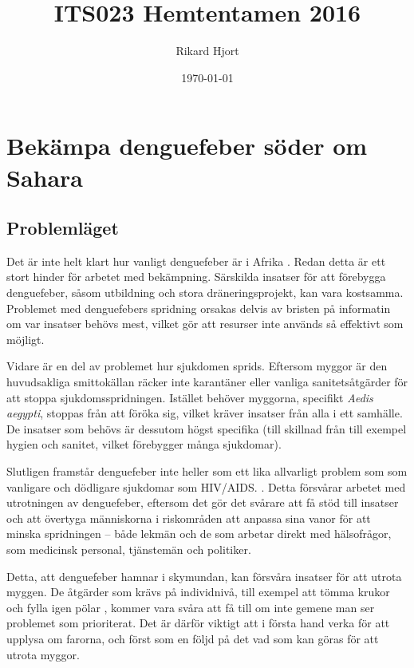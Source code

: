 \documentclass{article}
\title{ITS023 Hemtentamen 2016}
\date{\today}
\author{Rikard Hjort}
\begin{document}
\maketitle

\section{Bekämpa denguefeber söder om Sahara}

\subsection{Problemläget}


Det är inte helt klart hur vanligt denguefeber är i Afrika \cite[s. 8]{WHO:2009}. Redan detta är ett stort hinder för arbetet med bekämpning. Särskilda insatser för att förebygga denguefeber, såsom utbildning och stora dräneringsprojekt, kan vara kostsamma. Problemet med denguefebers spridning orsakas delvis av bristen på informatin om var insatser behövs mest, vilket gör att resurser inte används så effektivt som möjligt.

Vidare är en del av problemet hur sjukdomen sprids. Eftersom myggor är den huvudsakliga smittokällan \cite[s. 14]{WHO:2009} räcker inte karantäner eller vanliga sanitetsåtgärder för att stoppa sjukdomsspridningen. Istället behöver myggorna, specifikt \emph{Aedis aegypti}, stoppas från att föröka sig, vilket kräver insatser från alla i ett samhälle. De insatser som behövs är dessutom högst specifika (till skillnad från till exempel hygien och sanitet, vilket förebygger många sjukdomar).

Slutligen framstår denguefeber inte heller som ett lika allvarligt problem som som vanligare och dödligare sjukdomar som HIV/AIDS. \cite[s. 8]{WHO:2009}. Detta försvårar arbetet med utrotningen av denguefeber, eftersom det gör det svårare att få stöd till insatser och att övertyga människorna i riskområden att anpassa sina vanor för att minska spridningen – både lekmän och de som arbetar direkt med hälsofrågor, som medicinsk personal, tjänstemän och politiker.

Detta, att denguefeber hamnar i skymundan, kan försvåra insatser för att utrota myggen. De åtgärder som krävs på individnivå, till exempel att tömma krukor och fylla igen pölar \cite[s. 61]{Singapore:video, WHO:2009}, kommer vara svåra att få till om inte gemene man ser problemet som prioriterat. Det är därför viktigt att i första hand verka för att upplysa om farorna, och först som en följd på det vad som kan göras för att utrota myggor.
\end{document}
